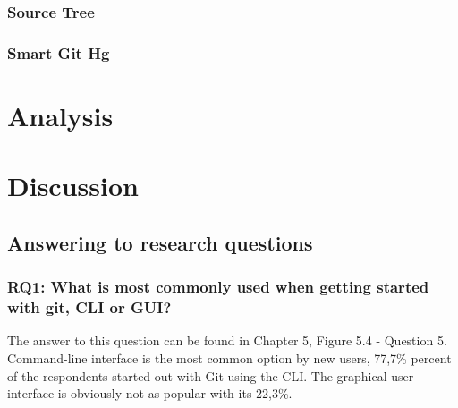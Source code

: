 \documentclass[a4paper,oneside]{bth} %
\begin{document}
				\subsection{Source Tree}
				\subsection{Smart Git Hg}
		
		\chapter{Analysis}
		
		\chapter{Discussion}
		\section{Answering to research questions}
		\subsection{RQ1: What is most commonly used when getting started with git, CLI or GUI?}
		The answer to this question can be found in Chapter 5, Figure 5.4 - Question 5.
		Command-line interface is the most common option by new users, 77,7\% percent of the respondents started out with Git using the CLI.
		The graphical user interface is obviously not as popular with its 22,3\%.
		
\end{document}
